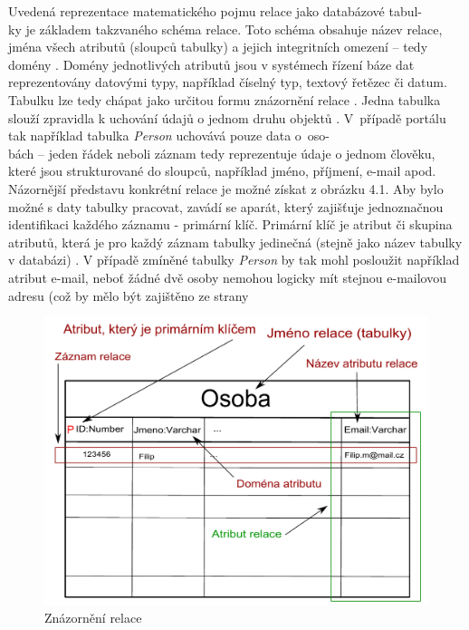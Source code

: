 \documentclass{projekt}
\begin{document}
Uvedená reprezentace matematického pojmu relace jako databázové tabul-\\ky je základem takzvaného schéma relace. Toto schéma obsahuje název relace, jména všech atributů (sloupců tabulky) a jejich integritních omezení – tedy domény \cite{_19}. Domény jednotlivých atributů jsou v systémech řízení báze dat reprezentovány datovými typy, například číselný typ, textový řetězec či datum. Tabulku lze tedy chápat jako určitou formu znázornění relace \cite{_21}.
Jedna tabulka slouží zpravidla k uchování údajů o jednom druhu objektů \cite{_20}. V~případě portálu tak například tabulka {\it Person} uchovává pouze data o~oso-\\bách – jeden řádek neboli záznam tedy reprezentuje údaje o jednom člověku, které jsou strukturované do sloupců, například jméno, příjmení, e-mail apod. Názornější představu konkrétní relace je možné získat z obrázku 4.1. Aby bylo možné s daty tabulky pracovat, zavádí se aparát, který zajišťuje jednoznačnou identifikaci každého záznamu - primární klíč. Primární klíč je atribut či skupina atributů, která je pro každý záznam tabulky jedinečná (stejně jako název tabulky v databázi) \cite{_20}. V případě zmíněné tabulky {\it Person} by tak mohl posloužit například atribut e-mail, neboť žádné dvě osoby nemohou logicky mít stejnou e-mailovou adresu (což by mělo být zajištěno ze strany 
\begin{figure}[htb]
\begin{center}
\includegraphics[scale=0.7]{relace.pdf}
\caption{Znázornění relace}
\end{center}
\end{figure}
\end{document}
